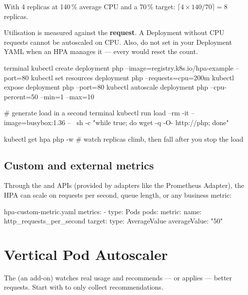 With 4 replicas at 140\,\% average CPU and a 70\,\% target:
\(\lceil 4 \times 140/70 \rceil = 8\) replicas.

\begin{warningbox}
Utilisation is measured against the \textbf{request}. A Deployment without CPU
requests cannot be autoscaled on CPU. Also, do not set  in your
Deployment YAML when an HPA manages it --- every  would reset the
count.
\end{warningbox}

\begin{tryit}
\begin{bashcode}{terminal}
kubectl create deployment php --image=registry.k8s.io/hpa-example --port=80
kubectl set resources deployment php --requests=cpu=200m
kubectl expose deployment php --port=80
kubectl autoscale deployment php --cpu-percent=50 --min=1 --max=10

# generate load in a second terminal
kubectl run load --rm -it --image=busybox:1.36 -- \
  sh -c "while true; do wget -q -O- http://php; done"

kubectl get hpa php -w      # watch replicas climb, then fall after you stop the load
\end{bashcode}
\end{tryit}

\subsection{Custom and external metrics}

Through the  and  APIs
(provided by adapters like the Prometheus Adapter), the HPA can scale on
requests per second, queue length, or any business metric:

\begin{yamlcode}{hpa-custom-metric.yaml}
metrics:
  - type: Pods
    pods:
      metric:
        name: http_requests_per_second
      target:
        type: AverageValue
        averageValue: "50"
\end{yamlcode}

\section{Vertical Pod Autoscaler}

The  (an add-on) watches real usage and recommends --- or applies ---
better requests. Start with \kc{updateMode: "Off"} to only collect
recommendations.

